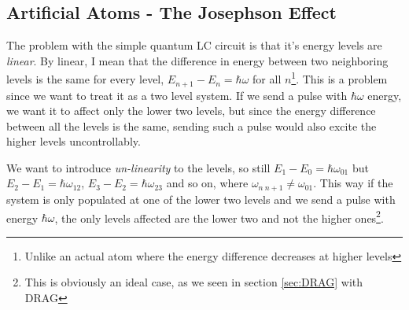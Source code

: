 \subsection{Artificial Atoms - The Josephson Effect}
The problem with the simple quantum LC circuit is that it's energy levels are \textit{linear}. By linear, I mean that the difference in energy between two neighboring levels is the same for every level, $E_{n + 1} - E_n = \hbar \omega$ for all $n$\footnote{Unlike an actual atom where the energy difference decreases at higher levels}. This is a problem since we want to treat it as a two level system. If we send a pulse with $\hbar \omega$ energy, we want it to affect only the lower two levels, but since the energy difference between all the levels is the same, sending such a pulse would also excite the higher levels uncontrollably.

We want to introduce \textit{un-linearity} to the levels, so still $E_1 - E_0 = \hbar \omega_{01} $ but $E_2 - E_1 = \hbar \omega_{12}$, $E_3 - E_2 = \hbar \omega_{23}$ and so on, where $\omega_{n\ n+1} \ne \omega_{01}$. This way if the system is only populated at one of the lower two levels and we send a pulse with energy $\hbar \omega$, the only levels affected are the lower two and not the higher ones\footnote{This is obviously an ideal case, as we seen in section \ref{sec:DRAG} with DRAG}.

